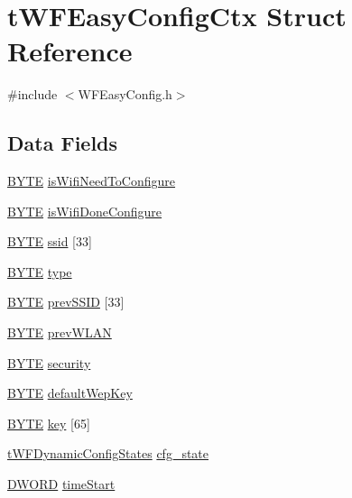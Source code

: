 \hypertarget{structt_w_f_easy_config_ctx}{}\section{t\+W\+F\+Easy\+Config\+Ctx Struct Reference}
\label{structt_w_f_easy_config_ctx}


{\ttfamily \#include $<$W\+F\+Easy\+Config.\+h$>$}

\subsection*{Data Fields}
\begin{DoxyCompactItemize}
\item 
\hyperlink{_generic_type_defs_8h_a4ae1dab0fb4b072a66584546209e7d58}{B\+Y\+T\+E} \hyperlink{structt_w_f_easy_config_ctx_a094f57409f7348159fd19f4b740ab6e5}{is\+Wifi\+Need\+To\+Configure}
\item 
\hyperlink{_generic_type_defs_8h_a4ae1dab0fb4b072a66584546209e7d58}{B\+Y\+T\+E} \hyperlink{structt_w_f_easy_config_ctx_aae8fb7a47e258b5bc2302599c8458408}{is\+Wifi\+Done\+Configure}
\item 
\hyperlink{_generic_type_defs_8h_a4ae1dab0fb4b072a66584546209e7d58}{B\+Y\+T\+E} \hyperlink{structt_w_f_easy_config_ctx_a4c6c3ae4a2e404d5b58010fddb8713ad}{ssid} \mbox{[}33\mbox{]}
\item 
\hyperlink{_generic_type_defs_8h_a4ae1dab0fb4b072a66584546209e7d58}{B\+Y\+T\+E} \hyperlink{structt_w_f_easy_config_ctx_aab7cf12125f16245546ef7411994ebb9}{type}
\item 
\hyperlink{_generic_type_defs_8h_a4ae1dab0fb4b072a66584546209e7d58}{B\+Y\+T\+E} \hyperlink{structt_w_f_easy_config_ctx_a6a03411d0def3b7a9b5a77ba32d2226f}{prev\+S\+S\+I\+D} \mbox{[}33\mbox{]}
\item 
\hyperlink{_generic_type_defs_8h_a4ae1dab0fb4b072a66584546209e7d58}{B\+Y\+T\+E} \hyperlink{structt_w_f_easy_config_ctx_a6847b94570010859cda0924289ca4edc}{prev\+W\+L\+A\+N}
\item 
\hyperlink{_generic_type_defs_8h_a4ae1dab0fb4b072a66584546209e7d58}{B\+Y\+T\+E} \hyperlink{structt_w_f_easy_config_ctx_a9333ef26affe031168b02f346cfc71cc}{security}
\item 
\hyperlink{_generic_type_defs_8h_a4ae1dab0fb4b072a66584546209e7d58}{B\+Y\+T\+E} \hyperlink{structt_w_f_easy_config_ctx_aa1a51be8a8f34df0cb2f7cc221a475d3}{default\+Wep\+Key}
\item 
\hyperlink{_generic_type_defs_8h_a4ae1dab0fb4b072a66584546209e7d58}{B\+Y\+T\+E} \hyperlink{structt_w_f_easy_config_ctx_a1460b61a0cefc0e4767b595a744600c0}{key} \mbox{[}65\mbox{]}
\item 
\hyperlink{_w_f_easy_config_8h_aa0669c0cc165a52111c294b4eb0e7c30}{t\+W\+F\+Dynamic\+Config\+States} \hyperlink{structt_w_f_easy_config_ctx_a626350f48325f53dd789ce68cdaa17ed}{cfg\+\_\+state}
\item 
\hyperlink{_generic_type_defs_8h_ad342ac907eb044443153a22f964bf0af}{D\+W\+O\+R\+D} \hyperlink{structt_w_f_easy_config_ctx_a4d4474eb729f6bdd02c975ccc10829f0}{time\+Start}
\end{DoxyCompactItemize}


